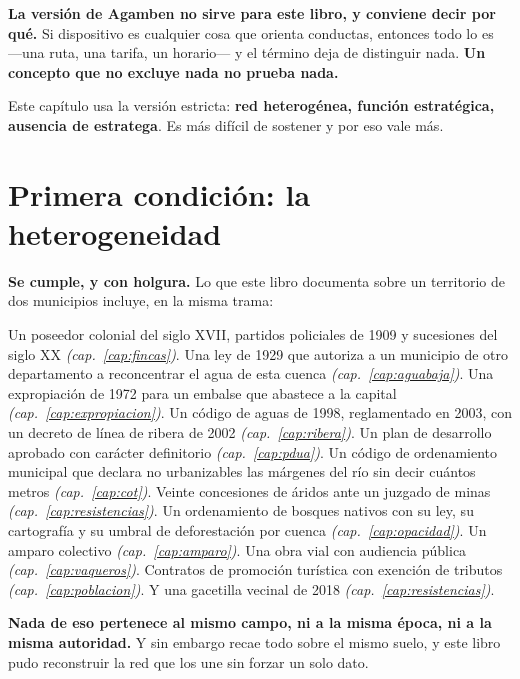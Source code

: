\begin{cautela}
\textbf{La versión de Agamben no sirve para este libro, y conviene decir por qué.} Si
dispositivo es cualquier cosa que orienta conductas, entonces todo lo es ---una ruta, una tarifa,
un horario--- y el término deja de distinguir nada. \textbf{Un concepto que no excluye nada no
prueba nada.}

Este capítulo usa la versión estricta: \textbf{red heterogénea, función estratégica, ausencia de
estratega}. Es más difícil de sostener y por eso vale más.
\end{cautela}

\section{Primera condición: la heterogeneidad}

\textbf{Se cumple, y con holgura.} Lo que este libro documenta sobre un territorio de dos
municipios incluye, en la misma trama:

Un poseedor colonial del siglo XVII, partidos policiales de 1909 y sucesiones del siglo XX \textit{(cap.\ \ref{cap:fincas})}. Una ley
de 1929 que autoriza a un municipio de otro departamento a reconcentrar el agua de esta cuenca
\textit{(cap.\ \ref{cap:aguabaja})}. Una expropiación de 1972 para un embalse que abastece a la
capital \textit{(cap.\ \ref{cap:expropiacion})}. Un código de aguas de 1998, reglamentado en 2003, con un decreto
de línea de ribera de 2002 \textit{(cap.\ \ref{cap:ribera})}. Un plan de desarrollo aprobado con carácter definitorio \textit{(cap.\ \ref{cap:pdua})}. Un código de ordenamiento municipal que declara no urbanizables las márgenes del río sin decir cuántos metros \textit{(cap.\ \ref{cap:cot})}. Veinte
concesiones de áridos ante un juzgado de minas \textit{(cap.\ \ref{cap:resistencias})}. Un
ordenamiento de bosques nativos con su ley, su cartografía y su umbral de deforestación por
cuenca \textit{(cap.\ \ref{cap:opacidad})}. Un amparo colectivo \textit{(cap.\
\ref{cap:amparo})}. Una obra vial con audiencia pública \textit{(cap.\ \ref{cap:vaqueros})}.
Contratos de promoción turística con exención de tributos \textit{(cap.\ \ref{cap:poblacion})}. Y
una gacetilla vecinal de 2018 \textit{(cap.\ \ref{cap:resistencias})}.

\textbf{Nada de eso pertenece al mismo campo, ni a la misma época, ni a la misma autoridad.} Y
sin embargo recae todo sobre el mismo suelo, y este libro pudo reconstruir la red que los une
sin forzar un solo dato.

